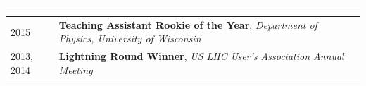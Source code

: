 \documentclass{letter}
\begin{document}
\vspace{-10pt}

\begin{flushleft}
\Large{\textsc{\textbf{\color{Maroon}{Awards}}}}
\vspace{1pt} %
\hrule
\end{flushleft}

\begin{tabular}{p{}p{}}
	2015
	&
	\textbf{Teaching Assistant Rookie of the Year}, \textit{Department of Physics, University of Wisconsin} 
\\
	2013, 2014
	& 
	\textbf{Lightning Round Winner}, \textit{US LHC User's Association Annual Meeting}
\\
\end{tabular}
\end{document}
